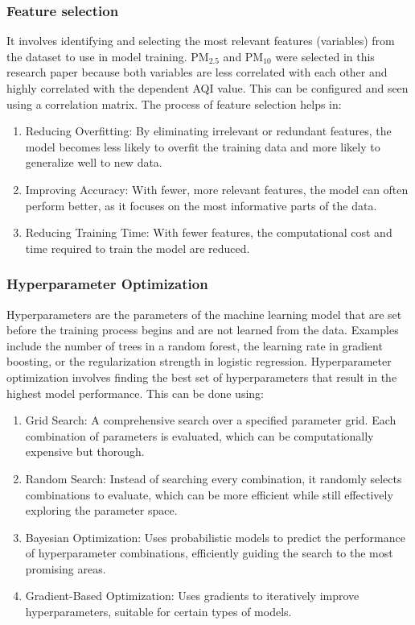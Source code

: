 \documentclass{book}
\numberwithin{equation}{section}
\numberwithin{figure}{section}
\begin{document}
\subsubsection{Feature selection}
\label{feature}
It involves identifying and selecting the most relevant features (variables) from the dataset to use in model training. PM$_{2.5}$ and PM$_{10}$ were selected in this research paper because both variables are less correlated with each other and highly correlated with the dependent AQI value. This can be configured and seen using a correlation matrix. The process of feature selection helps in:\\
\begin{enumerate}
\item Reducing Overfitting: By eliminating irrelevant or redundant features, the model becomes less likely to overfit the training data and more likely to generalize well to new data.
\item Improving Accuracy: With fewer, more relevant features, the model can often perform better, as it focuses on the most informative parts of the data.
\item Reducing Training Time: With fewer features, the computational cost and time required to train the model are reduced.
\end{enumerate}
\subsubsection{Hyperparameter Optimization}
\label{hyperparameter}
Hyperparameters are the parameters of the machine learning model that are set before the training process begins and are not learned from the data. Examples include the number of trees in a random forest, the learning rate in gradient boosting, or the regularization strength in logistic regression. Hyperparameter optimization involves finding the best set of hyperparameters that result in the highest model performance. This can be done using:
\begin{enumerate}
\item Grid Search: A comprehensive search over a specified parameter grid. Each combination of parameters is evaluated, which can be computationally expensive but thorough.
\item Random Search: Instead of searching every combination, it randomly selects combinations to evaluate, which can be more efficient while still effectively exploring the parameter space.
\item Bayesian Optimization: Uses probabilistic models to predict the performance of hyperparameter combinations, efficiently guiding the search to the most promising areas.
\item Gradient-Based Optimization: Uses gradients to iteratively improve hyperparameters, suitable for certain types of models.
\end{enumerate}
\end{document}
